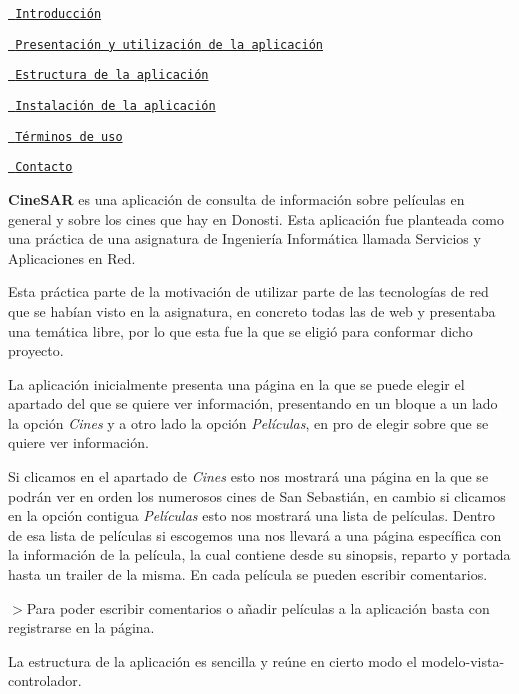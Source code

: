 
\begin{DoxyEnumerate}
\item \href{\#introducción}{\texttt{ Introducción}}
\item \href{\#presentación-y-utilización-de-la-aplicación}{\texttt{ Presentación y utilización de la aplicación}}
\item \href{\#estructura-de-la-aplicación}{\texttt{ Estructura de la aplicación}}
\item \href{\#instalación-de-la-aplicación}{\texttt{ Instalación de la aplicación}}
\item \href{\#términos-de-uso}{\texttt{ Términos de uso}}
\item \href{\#contacto}{\texttt{ Contacto}}
\end{DoxyEnumerate}

{\bfseries{Cine\+S\+AR}} es una aplicación de consulta de información sobre películas en general y sobre los cines que hay en Donosti. Esta aplicación fue planteada como una práctica de una asignatura de Ingeniería Informática llamada Servicios y Aplicaciones en Red.



Esta práctica parte de la motivación de utilizar parte de las tecnologías de red que se habían visto en la asignatura, en concreto todas las de web y presentaba una temática libre, por lo que esta fue la que se eligió para conformar dicho proyecto.

La aplicación inicialmente presenta una página en la que se puede elegir el apartado del que se quiere ver información, presentando en un bloque a un lado la opción {\itshape Cines} y a otro lado la opción {\itshape Películas}, en pro de elegir sobre que se quiere ver información.

Si clicamos en el apartado de {\itshape Cines} esto nos mostrará una página en la que se podrán ver en orden los numerosos cines de San Sebastián, en cambio si clicamos en la opción contigua {\itshape Películas} esto nos mostrará una lista de películas. Dentro de esa lista de películas si escogemos una nos llevará a una página específica con la información de la película, la cual contiene desde su sinopsis, reparto y portada hasta un trailer de la misma. En cada película se pueden escribir comentarios.

$>$Para poder escribir comentarios o añadir películas a la aplicación basta con registrarse en la página.

La estructura de la aplicación es sencilla y reúne en cierto modo el modelo-\/vista-\/controlador.



